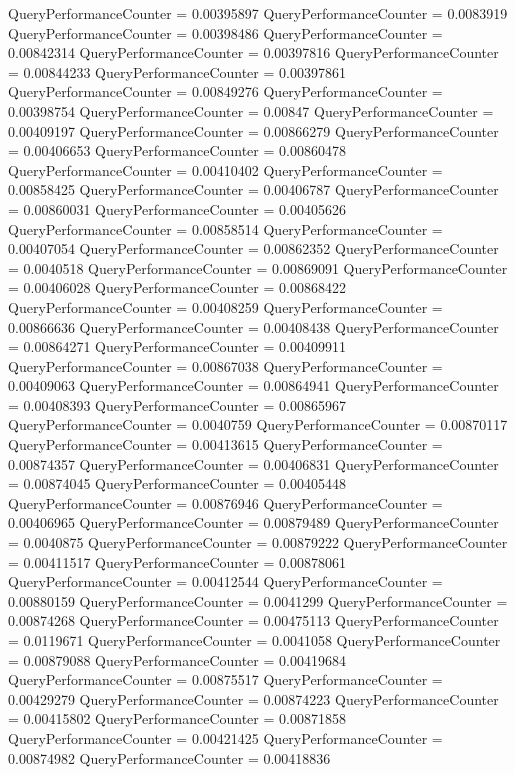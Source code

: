 \documentclass[9pt]{article}
\theoremstyle{plain}
\theoremstyle{definition}
\theoremstyle{remark}
\numberwithin{equation}{section}
\begin{document}
QueryPerformanceCounter  =  0.00395897
QueryPerformanceCounter  =  0.0083919
QueryPerformanceCounter  =  0.00398486
QueryPerformanceCounter  =  0.00842314
QueryPerformanceCounter  =  0.00397816
QueryPerformanceCounter  =  0.00844233
QueryPerformanceCounter  =  0.00397861
QueryPerformanceCounter  =  0.00849276
QueryPerformanceCounter  =  0.00398754
QueryPerformanceCounter  =  0.00847
QueryPerformanceCounter  =  0.00409197
QueryPerformanceCounter  =  0.00866279
QueryPerformanceCounter  =  0.00406653
QueryPerformanceCounter  =  0.00860478
QueryPerformanceCounter  =  0.00410402
QueryPerformanceCounter  =  0.00858425
QueryPerformanceCounter  =  0.00406787
QueryPerformanceCounter  =  0.00860031
QueryPerformanceCounter  =  0.00405626
QueryPerformanceCounter  =  0.00858514
QueryPerformanceCounter  =  0.00407054
QueryPerformanceCounter  =  0.00862352
QueryPerformanceCounter  =  0.0040518
QueryPerformanceCounter  =  0.00869091
QueryPerformanceCounter  =  0.00406028
QueryPerformanceCounter  =  0.00868422
QueryPerformanceCounter  =  0.00408259
QueryPerformanceCounter  =  0.00866636
QueryPerformanceCounter  =  0.00408438
QueryPerformanceCounter  =  0.00864271
QueryPerformanceCounter  =  0.00409911
QueryPerformanceCounter  =  0.00867038
QueryPerformanceCounter  =  0.00409063
QueryPerformanceCounter  =  0.00864941
QueryPerformanceCounter  =  0.00408393
QueryPerformanceCounter  =  0.00865967
QueryPerformanceCounter  =  0.0040759
QueryPerformanceCounter  =  0.00870117
QueryPerformanceCounter  =  0.00413615
QueryPerformanceCounter  =  0.00874357
QueryPerformanceCounter  =  0.00406831
QueryPerformanceCounter  =  0.00874045
QueryPerformanceCounter  =  0.00405448
QueryPerformanceCounter  =  0.00876946
QueryPerformanceCounter  =  0.00406965
QueryPerformanceCounter  =  0.00879489
QueryPerformanceCounter  =  0.0040875
QueryPerformanceCounter  =  0.00879222
QueryPerformanceCounter  =  0.00411517
QueryPerformanceCounter  =  0.00878061
QueryPerformanceCounter  =  0.00412544
QueryPerformanceCounter  =  0.00880159
QueryPerformanceCounter  =  0.0041299
QueryPerformanceCounter  =  0.00874268
QueryPerformanceCounter  =  0.00475113
QueryPerformanceCounter  =  0.0119671
QueryPerformanceCounter  =  0.0041058
QueryPerformanceCounter  =  0.00879088
QueryPerformanceCounter  =  0.00419684
QueryPerformanceCounter  =  0.00875517
QueryPerformanceCounter  =  0.00429279
QueryPerformanceCounter  =  0.00874223
QueryPerformanceCounter  =  0.00415802
QueryPerformanceCounter  =  0.00871858
QueryPerformanceCounter  =  0.00421425
QueryPerformanceCounter  =  0.00874982
QueryPerformanceCounter  =  0.00418836
\end{document}
